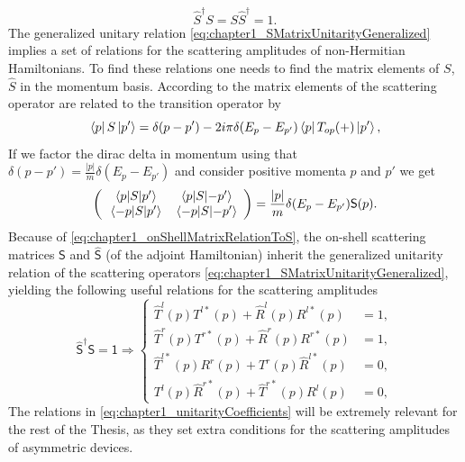 %
\begin{equation}
  \widehat{S}^\dagger S = S\widehat{S}^\dagger= 1.
  \label{eq:chapter1_SMatrixUnitarityGeneralized}
\end{equation}
%
The generalized unitary relation \eqref{eq:chapter1_SMatrixUnitarityGeneralized} implies a set of relations for the scattering amplitudes of non-Hermitian Hamiltonians. To find these relations one needs to find the matrix elements of $S$, $\widehat{S}$ in the momentum basis. According to \cite{Muga2004} the matrix elements of the scattering operator are related to the transition operator by
%
\begin{equation}
    \bra{p} S \ket{p'} = \delta (p-p') -2 i \pi \delta (E_p-E_{p'}) \bra{p}T_{op}(+)\ket{p'},
    \label{eq:SmatrixElements}
\end{equation}
%
If we factor the dirac delta in momentum using that $\delta(p-p') = \frac{|p|}{m}\delta(E_{p}-E_{p'})$ and consider positive momenta $p$ and $p'$ we get
%
\begin{equation}
  \left(
  \begin{array}{cc}
    \mel{p}{S}{p'} & \mel{p}{S}{-p'}\\
    \mel{-p}{S}{p'} & \mel{-p}{S}{-p'}
  \end{array}
  \right)
  = \frac{|p|}{m}\delta(E_{p}-E_{p'})\mathsf{S}(p).
  \label{eq:chapter1_onShellMatrixRelationToS}
\end{equation}
%
Because of \eqref{eq:chapter1_onShellMatrixRelationToS}, the on-shell scattering matrices $\mathsf{S}$ and $\mathsf{\widehat{S}}$ (of the adjoint Hamiltonian) inherit the generalized unitarity relation of the scattering operators \eqref{eq:chapter1_SMatrixUnitarityGeneralized}, yielding the following useful relations for the scattering amplitudes
%
\begin{equation}
  \mathsf{\widehat{S}}^\dagger\mathsf{S} = \mathsf{1}
  \Longrightarrow
  \begin{cases}
    \widehat T^l(p) T^{l*}(p) + \widehat R^l(p) R^{l*}(p) &= 1,
    \\
    \widehat T^r(p) T^{r*}(p) + \widehat R^r(p) R^{r*}(p) &= 1,
    \\
    \widehat T^{l*}(p) R^r(p) + T^r(p) \widehat R^{l*}(p) &= 0,
    \\
    T^l(p) \widehat R^{r*}(p) + \widehat T^{r*}(p) R^l(p) &= 0,
  \end{cases}
  \label{eq:chapter1_unitarityCoefficients}
\end{equation}
%
The relations in \eqref{eq:chapter1_unitarityCoefficients} will be extremely relevant for the rest of the Thesis, as they set extra conditions for the scattering amplitudes of asymmetric devices.

